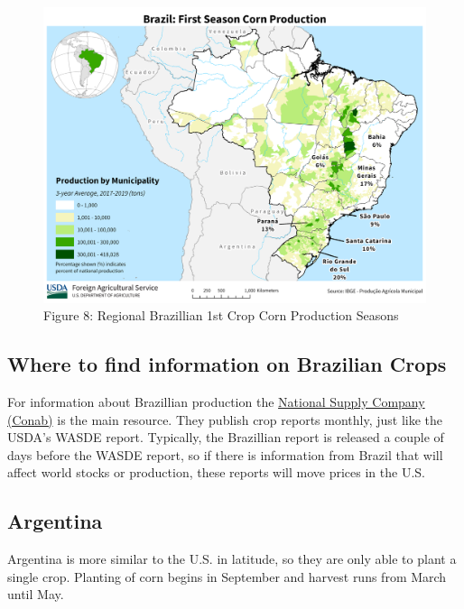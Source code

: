 \documentclass[
]{book}
\begin{document}
\begin{figure}
\centering
\includegraphics{assets/Brazil_FirstSeason_Corn.png}
\caption{Figure 8: Regional Brazillian 1st Crop Corn Production Seasons}
\end{figure}

\hypertarget{where-to-find-information-on-brazilian-crops}{%
\subsection{Where to find information on Brazilian Crops}\label{where-to-find-information-on-brazilian-crops}}

For information about Brazillian production the \href{http://www.conab.gov.br/index.php}{National Supply Company (Conab)} is the main resource. They publish crop reports monthly, just like the USDA's WASDE report. Typically, the Brazillian report is released a couple of days before the WASDE report, so if there is information from Brazil that will affect world stocks or production, these reports will move prices in the U.S.

\hypertarget{argentina}{%
\subsection{Argentina}\label{argentina}}

Argentina is more similar to the U.S. in latitude, so they are only able to plant a single crop. Planting of corn begins in September and harvest runs from March until May.
\end{document}
